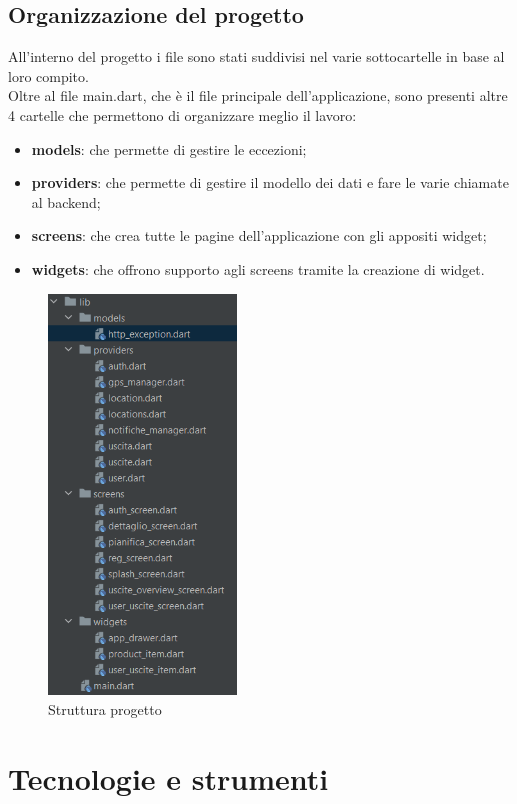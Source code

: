 \newpage

\subsection{Organizzazione del progetto}

All'interno del progetto i file sono stati suddivisi nel varie sottocartelle in base al loro compito.\\
Oltre al file main.dart, che è il file principale dell'applicazione, sono presenti altre 4 cartelle che permettono di organizzare meglio il lavoro:
\begin{itemize}
	\item \textbf{models}: che permette di gestire le eccezioni;
	\item \textbf{providers}: che permette di gestire il modello dei dati e fare le varie chiamate al backend;
	\item \textbf{screens}: che crea tutte le pagine dell'applicazione con gli appositi widget;
	\item \textbf{widgets}: che offrono supporto agli screens tramite la creazione di widget.
\end{itemize}
\begin{figure}[htbp]	
	\centering
	\includegraphics[width=5cm]{immagini/struttura.png}
	\caption{Struttura progetto}
	\label{fig:Struttura progetto}
\end{figure}

\newpage

\section{Tecnologie e strumenti}

